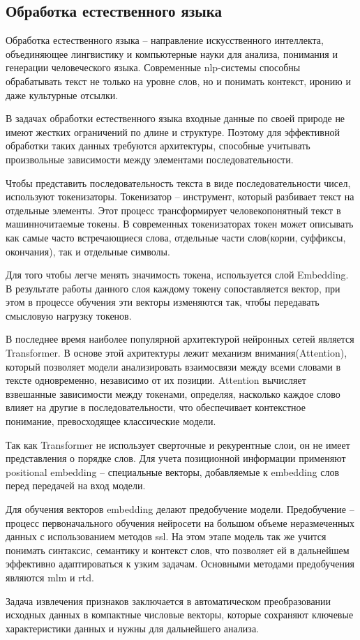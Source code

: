 \documentclass[../part_1.tex]{subfiles}
\begin{document}
\subsection{Обработка естественного языка}
\par Обработка естественного языка -- направление искусственного интеллекта, объединяющее лингвистику и компьютерные науки для анализа, понимания и генерации человеческого языка. Современные \acrshort{nlp}-системы способны обрабатывать текст не только на уровне слов, но и понимать контекст, иронию и даже культурные отсылки.
\par В задачах обработки естественного языка входные данные по своей природе не имеют жестких ограничений по длине и структуре. Поэтому для эффективной обработки таких данных требуются архитектуры, способные учитывать произвольные зависимости между элементами последовательности. 
\par Чтобы представить последовательность текста в виде последовательности чисел, используют токенизаторы. Токенизатор -- инструмент, который разбивает текст на отдельные элементы. Этот процесс трансформирует человекопонятный текст в машинночитаемые токены. В современных токенизаторах токен может описывать как самые часто встречающиеся слова, отдельные части слов(корни, суффиксы, окончания), так и отдельные символы. 
\par Для того чтобы легче менять значимость токена, используется слой Embedding. В результате работы данного слоя каждому токену сопоставляется вектор, при этом в процессе обучения эти векторы изменяются так, чтобы передавать смысловую нагрузку токенов.
\par В последнее время наиболее популярной архитектурой нейронных сетей является Transformer. В основе этой ахритектуры лежит механизм внимания(Attention), который позволяет модели анализировать взаимосвязи между всеми словами в тексте одновременно, независимо от их позиции. Attention вычисляет взвешанные зависимости между токенами, определяя, насколько каждое слово влияет на другие в последовательности, что обеспечивает контекстное понимание, превосходящее классические модели.
\par Так как Transformer не использует сверточные и рекурентные слои, он не имеет представления о порядке слов. Для учета позиционной информации применяют positional embedding -- специальные векторы, добавляемые к embedding слов перед передачей на вход модели.
\par Для обучения векторов embedding делают предобучение модели. Предобучение -- процесс первоначального обучения нейросети на большом объеме неразмеченных данных с использованием методов \acrfull{ssl}. На этом этапе модель так же учится понимать синтаксис, семантику и контекст слов, что позволяет ей в дальнейшем эффективно адаптироваться к узким задачам. Основными методами предобучения являются \acrshort{mlm}\cite{sinha2021maskedlanguagemodelingdistributional} и \acrshort{rtd}.
\par Задача извлечения признаков заключается в автоматическом преобразовании исходных данных в компактные числовые векторы, которые сохраняют ключевые характеристики данных и нужны для дальнейшего анализа. 
\end{document}
